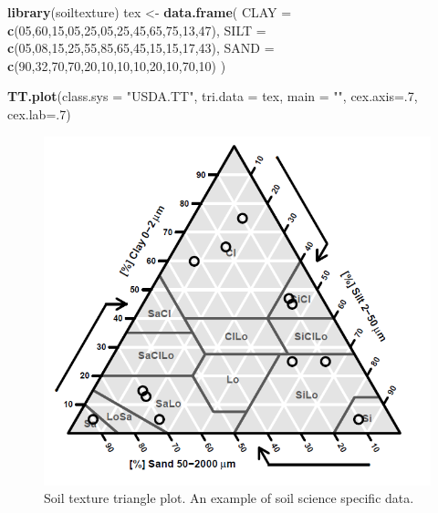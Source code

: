 \documentclass[10pt,b5paper,]{book}
\newenvironment{Shaded}{\begin{snugshade}}{\end{snugshade}}
\newcommand{\DataTypeTok}[1]{\textcolor[rgb]{0.13,0.29,0.53}{#1}}
\newcommand{\DecValTok}[1]{\textcolor[rgb]{0.00,0.00,0.81}{#1}}
\newcommand{\KeywordTok}[1]{\textcolor[rgb]{0.13,0.29,0.53}{\textbf{#1}}}
\newcommand{\NormalTok}[1]{#1}
\newcommand{\StringTok}[1]{\textcolor[rgb]{0.31,0.60,0.02}{#1}}
\theoremstyle{definition}
\theoremstyle{definition}
\theoremstyle{definition}
\theoremstyle{remark}
\begin{document}
\begin{Shaded}
\begin{Highlighting}[]
\KeywordTok{library}\NormalTok{(soiltexture)}
\NormalTok{tex <-}\StringTok{ }\KeywordTok{data.frame}\NormalTok{(}
  \DataTypeTok{CLAY =} \KeywordTok{c}\NormalTok{(}\DecValTok{05}\NormalTok{,}\DecValTok{60}\NormalTok{,}\DecValTok{15}\NormalTok{,}\DecValTok{05}\NormalTok{,}\DecValTok{25}\NormalTok{,}\DecValTok{05}\NormalTok{,}\DecValTok{25}\NormalTok{,}\DecValTok{45}\NormalTok{,}\DecValTok{65}\NormalTok{,}\DecValTok{75}\NormalTok{,}\DecValTok{13}\NormalTok{,}\DecValTok{47}\NormalTok{),}
  \DataTypeTok{SILT =} \KeywordTok{c}\NormalTok{(}\DecValTok{05}\NormalTok{,}\DecValTok{08}\NormalTok{,}\DecValTok{15}\NormalTok{,}\DecValTok{25}\NormalTok{,}\DecValTok{55}\NormalTok{,}\DecValTok{85}\NormalTok{,}\DecValTok{65}\NormalTok{,}\DecValTok{45}\NormalTok{,}\DecValTok{15}\NormalTok{,}\DecValTok{15}\NormalTok{,}\DecValTok{17}\NormalTok{,}\DecValTok{43}\NormalTok{),}
  \DataTypeTok{SAND =} \KeywordTok{c}\NormalTok{(}\DecValTok{90}\NormalTok{,}\DecValTok{32}\NormalTok{,}\DecValTok{70}\NormalTok{,}\DecValTok{70}\NormalTok{,}\DecValTok{20}\NormalTok{,}\DecValTok{10}\NormalTok{,}\DecValTok{10}\NormalTok{,}\DecValTok{10}\NormalTok{,}\DecValTok{20}\NormalTok{,}\DecValTok{10}\NormalTok{,}\DecValTok{70}\NormalTok{,}\DecValTok{10}\NormalTok{)}
\NormalTok{ )}
 
\KeywordTok{TT.plot}\NormalTok{(}\DataTypeTok{class.sys =} \StringTok{"USDA.TT"}\NormalTok{, }\DataTypeTok{tri.data =}\NormalTok{ tex, }\DataTypeTok{main =} \StringTok{""}\NormalTok{, }
        \DataTypeTok{cex.axis=}\NormalTok{.}\DecValTok{7}\NormalTok{, }\DataTypeTok{cex.lab=}\NormalTok{.}\DecValTok{7}\NormalTok{)}
\end{Highlighting}
\end{Shaded}

\begin{figure}
\centering
\includegraphics{images/Data_sharing_triangle.png}
\caption{Soil texture triangle plot. An example of soil science specific
data.}
\end{figure}
\end{document}
